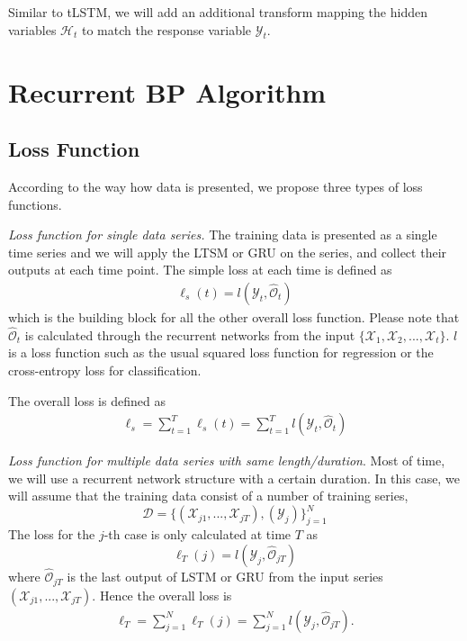 \documentclass[journal]{IEEEtran}
\begin{document}
Similar to tLSTM, we will add an additional transform mapping the hidden variables $\mathcal{H}_t$ to match the response variable $\mathcal{Y}_t$.




\section{Recurrent BP Algorithm} \label{Sec:3} 
\subsection{Loss Function}
According to the way how data is presented, we propose three types of loss functions.

\textit{Loss function for single data series.} The training data is presented as a single time series and we will apply the LTSM or GRU on the series, and collect their outputs at each time point. The simple loss at each time is defined as
\begin{align*}
\ell_s(t) = l(\mathcal{Y}_t, \widehat{\mathcal{O}}_t) 
\end{align*}
which is the building block for all the other overall loss function.
Please note that $\widehat{\mathcal{O}}_t$ is calculated through the recurrent networks from the input $\{\mathcal{X}_1, \mathcal{X}_2, ..., \mathcal{X}_t\}$.  $l$ is a loss function such as the usual squared loss function for regression or the cross-entropy loss for classification.

The overall loss is defined as
\begin{align}
\ell_s = \sum^T_{t=1}\ell_s(t) =\sum^T_{t=1}l(\mathcal{Y}_t, \widehat{\mathcal{O}}_t)  \label{Eq14}
\end{align}

\textit{Loss function for multiple data series with same length/duration}.  Most of time, we will use a recurrent network structure with a certain duration. In this case, we will assume that the training data consist of a number of training series,
\[
\mathcal{D} = \{(\mathcal{X}_{j1}, ..., \mathcal{X}_{jT}), (\mathcal{Y}_{j})\}^N_{j=1}
\]
The loss for the $j$-th case is only calculated at time $T$ as
\[
\ell_T(j) = l(\mathcal{Y}_j, \widehat{\mathcal{O}}_{jT})
\]
where $\widehat{\mathcal{O}}_{jT}$ is the last output of LSTM or GRU from the input series $(\mathcal{X}_{j1}, ..., \mathcal{X}_{jT})$.
Hence the overall loss is
\begin{align}
\ell_T = \sum^N_{j=1}\ell_T (j) =\sum^N_{j=1}l(\mathcal{Y}_j, \widehat{\mathcal{O}}_{jT}). \label{Eq15}
\end{align}
\end{document}
